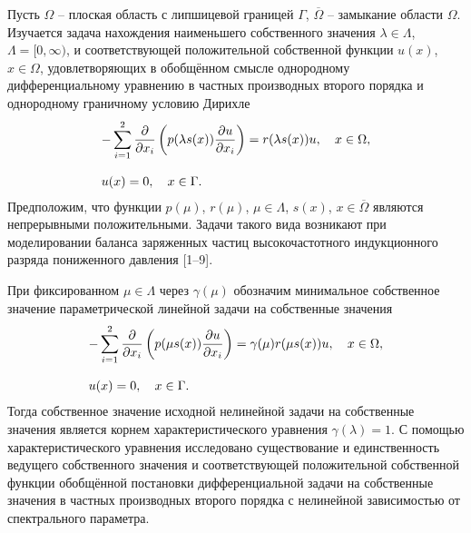 \documentclass{vzmsthesis}
\begin{document}

\vzmscaption

Пусть
$\Omega$ -- плоская область с липшицевой границей $\Gamma$,
$\overline{\Omega}$ -- замыкание области $\Omega$.
Изучается задача нахождения наименьшего собственного
значения ${\lambda\in\Lambda}$, ${\Lambda=[0,\infty)}$, и соответствующей
положительной собственной функции $u(x)$, ${x\in\Omega}$,
удовлетворяющих в обобщённом смысле однородному
дифференциальному уравнению
в частных производных
второго порядка и
однородному граничному условию Дирихле
\begin{equation*}
\begin{array}{l}
\displaystyle
-\sum_{i=1}^{2}\frac{\partial}{\partial x_i}\left(p(\lambda s(x))\frac{\partial u}{\partial x_i}\right)=
r(\lambda s(x))u,\quad
x\in\Omega,
\bigskip
\\
\displaystyle
u(x)=0,\quad
x\in\Gamma.
\end{array}
\label{sol_f1}
\end{equation*}
Предположим, что функции
$p(\mu)$,
$r(\mu)$, $\mu\in\Lambda$,
$s(x)$, $x\in\overline{\Omega}$
являются непрерывными положительными.
Задачи такого вида возникают при моделировании баланса заряженных частиц
высокочастотного индукционного разряда
пониженного давления
[1--9].

При фиксированном $\mu\in\Lambda$
через $\gamma(\mu)$ обозначим
минимальное собственное значение
параметрической линейной задачи на собственные значения
\begin{equation*}
\begin{array}{l}
\displaystyle
-\sum_{i=1}^{2}\frac{\partial}{\partial x_i}
\left(p(\mu s(x))\frac{\partial u}{\partial x_i}\right)=
\gamma(\mu)
r(\mu s(x))u,\quad
x\in\Omega,
\bigskip
\\
\displaystyle
u(x)=0,\quad
x\in\Gamma.
\end{array}
\label{sol_f1}
\end{equation*}
Тогда собственное значение исходной нелинейной задачи на собственные значения
является корнем характеристического уравнения
$\gamma(\lambda)=1.$
С помощью характеристического уравнения исследовано существование
и единственность
ведущего собственного значения и
соответствующей положительной собственной функции
обобщённой постановки
дифференциальной задачи на собственные значения
в частных производных
второго порядка
с нелинейной зависимостью от спектрального параметра.
\end{document}
